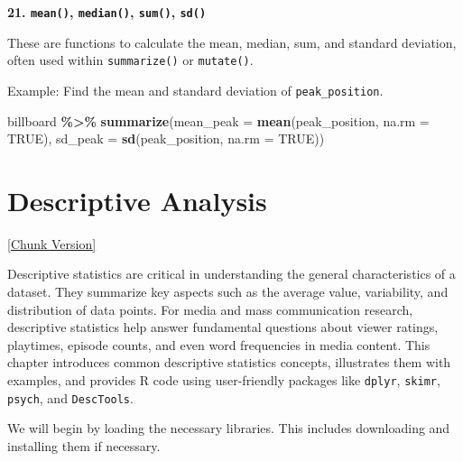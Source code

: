 \documentclass[
]{book}
\newenvironment{Shaded}{\begin{snugshade}}{\end{snugshade}}
\newcommand{\AttributeTok}[1]{\textcolor[rgb]{0.13,0.29,0.53}{#1}}
\newcommand{\ConstantTok}[1]{\textcolor[rgb]{0.56,0.35,0.01}{#1}}
\newcommand{\FunctionTok}[1]{\textcolor[rgb]{0.13,0.29,0.53}{\textbf{#1}}}
\newcommand{\NormalTok}[1]{#1}
\newcommand{\SpecialCharTok}[1]{\textcolor[rgb]{0.81,0.36,0.00}{\textbf{#1}}}
\begin{document}
\textbf{21. \texttt{mean()}, \texttt{median()}, \texttt{sum()}, \texttt{sd()}}

These are functions to calculate the mean, median, sum, and standard deviation, often used within \texttt{summarize()} or \texttt{mutate()}.

Example: Find the mean and standard deviation of \texttt{peak\_position}.

\begin{Shaded}
\begin{Highlighting}[]
\NormalTok{billboard }\SpecialCharTok{\%\textgreater{}\%}
  \FunctionTok{summarize}\NormalTok{(}\AttributeTok{mean\_peak =} \FunctionTok{mean}\NormalTok{(peak\_position, }\AttributeTok{na.rm =} \ConstantTok{TRUE}\NormalTok{), }
            \AttributeTok{sd\_peak =} \FunctionTok{sd}\NormalTok{(peak\_position, }\AttributeTok{na.rm =} \ConstantTok{TRUE}\NormalTok{))}
\end{Highlighting}
\end{Shaded}

\chapter{Descriptive Analysis}\label{descriptive-analysis}

\href{files/09-descriptive_stats-chunks.Rmd}{{[}Chunk Version{]}}

Descriptive statistics are critical in understanding the general characteristics of a dataset. They summarize key aspects such as the average value, variability, and distribution of data points. For media and mass communication research, descriptive statistics help answer fundamental questions about viewer ratings, playtimes, episode counts, and even word frequencies in media content. This chapter introduces common descriptive statistics concepts, illustrates them with examples, and provides R code using user-friendly packages like \texttt{dplyr}, \texttt{skimr}, \texttt{psych}, and \texttt{DescTools}.

We will begin by loading the necessary libraries. This includes downloading and installing them if necessary.
\end{document}
